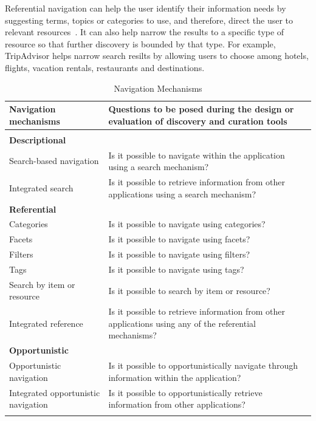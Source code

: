 \documentclass{sigchi}
\begin{document}
{{{{Referential navigation can help the user identify their information needs by suggesting terms, topics or categories to use, and therefore, direct the user to relevant resources~\cite{levene2011introduction}. It can also help narrow the results to a specific type of resource so that further discovery is bounded by that type. For example, TripAdvisor helps narrow search resilts by allowing users to choose among hotels, flights, vacation rentals, restaurants and destinations.

} %


\begin{table}[ht!]
\caption{Navigation Mechanisms}
\label{table:navigation} 
\begin{tabular}{|p{}| p{}|}
\hline
Navigation mechanisms     	& Questions to be posed during the design or evaluation of  discovery and curation tools \\
\hline
&\\
\textbf{Descriptional} 			& \\
Search-based navigation							& Is it possible to navigate within the application using a search mechanism? \\
Integrated search				& Is it possible to retrieve information from  other applications using a search mechanism? \\
\textbf{Referential}       		& \\
Categories				 		& Is it possible to navigate using categories? \\
Facets				    		& Is it possible to navigate using facets? \\
Filters					  		& Is it possible to navigate using filters? \\
Tags				      		& Is it possible to navigate using tags? \\
Search by item or resource		& Is it possible to search by item or resource? \\
Integrated reference			& Is it possible to retrieve information from other applications using any of the referential mechanisms?\\
\textbf{Opportunistic}          & \\
Opportunistic navigation        & Is it possible to opportunistically navigate through information within the application? \\
Integrated opportunistic navigation        & Is it possible to opportunistically retrieve information from other applications? \\
&\\

\end{tabular}
\end{table}}}}
\end{document}
